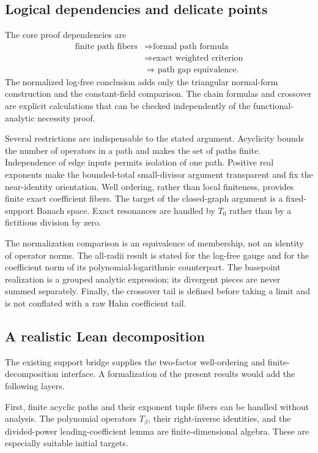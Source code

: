 \documentclass[11pt,a4paper]{article}
\numberwithin{equation}{section}
\theoremstyle{definition}
\theoremstyle{remark}
\begin{document}
\subsection{Logical dependencies and delicate points}
The core proof dependencies are
\[
\begin{aligned}
 \text{finite path fibers}
 &\Longrightarrow\text{formal path formula}\\
 &\Longrightarrow\text{exact weighted criterion}\\
 &\Longrightarrow\text{path gap equivalence}.
\end{aligned}
\]
The normalized log-free conclusion adds only the triangular normal-form
construction and the constant-field comparison. The chain formulas and
crossover are explicit calculations that can be checked independently of
the functional-analytic necessity proof.

Several restrictions are indispensable to the stated argument. Acyclicity
bounds the number of operators in a path and makes the set of paths finite.
Independence of edge inputs permits isolation of one path. Positive real
exponents make the bounded-total small-divisor argument transparent and
fix the near-identity orientation. Well ordering, rather than local
finiteness, provides finite exact coefficient fibers. The target of the
closed-graph argument is a fixed-support Banach space. Exact resonances
are handled by $T_0$ rather than by a fictitious division by zero.

The normalization comparison is an equivalence of membership, not an
identity of operator norms. The all-radii result is stated for the
log-free gauge and for the coefficient norm of its polynomial-logarithmic
counterpart. The basepoint realization is a grouped analytic expression;
its divergent pieces are never summed separately. Finally, the
crossover tail is defined before taking a limit and is not conflated with
a raw Hahn coefficient tail.

\subsection{A realistic Lean decomposition}
The existing support bridge \cite{repo-lean} supplies the two-factor
well-ordering and finite-decomposition interface. A formalization of the
present results would add the following layers.

First, finite acyclic paths and their exponent tuple fibers can be handled
without analysis. The polynomial operators $T_\beta$, their right-inverse
identities, and the divided-power leading-coefficient lemma are
finite-dimensional algebra. These are especially suitable initial targets.
\end{document}
